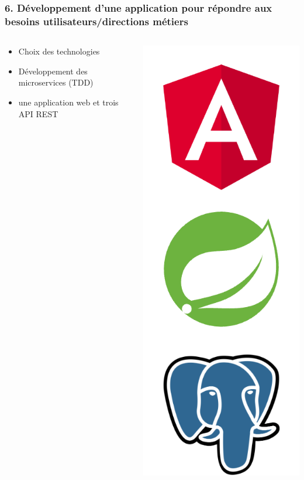 \documentclass[aspectratio=169]{beamer}
\begin{document}
\begin{frame}
  \frametitle{6. Développement d’une application pour répondre aux besoins utilisateurs/directions métiers}
  \begin{columns}
    \begin{column}{0.5\textwidth}
      \begin{itemize}
        \item Choix des technologies
        \item Développement des microservices (TDD)
        \item une application web et trois API REST 
      \end{itemize}
    \end{column}
    \begin{column}{0.5\textwidth}
      \includegraphics[height=0.75\textheight, center]{Imgs/icons.png}
    \end{column}
  \end{columns}
\end{frame}
\end{document}
